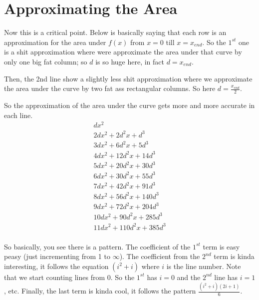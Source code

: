 \documentclass{report}
\begin{document}
\section{Approximating the Area}
Now this is a critical point. Below is basically saying that each row is an
approximation for the area under $f(x)$ from $x = 0$ till $x = x_{end}$. So the
$1^{st}$ one is a shit approximation where were approximate the area under that
curve by only one big fat column; so $d$ is so huge here, in fact $d =
x_{end}$.

Then, the 2nd line show a slightly less shit approximation where we approximate
the area under the curve by two fat ass rectangular columns. So here $d =
\frac{x_{end}}{2}$.

So the approximation of the area under the curve gets more and more accurate in
each line.
\[\begin{split}
  dx^2\\
  2dx^2 + 2d^2x + d^3\\
  3dx^2 + 6d^2x + 5d^3\\
  4dx^2 + 12d^2x + 14d^3\\
  5dx^2 + 20d^2x + 30d^3\\
  6dx^2 + 30d^2x + 55d^3\\
  7dx^2 + 42d^2x + 91d^3\\
  8dx^2 + 56d^2x + 140d^3\\
  9dx^2 + 72d^2x + 204d^3\\
  10dx^2 + 90d^2x + 285d^3\\
  11dx^2 + 110d^2x + 385d^3\\
\end{split}\]

So basically, you see there is a pattern. The coefficient of the $1^{st}$ term
is easy peasy (just incrementing from 1 to $\infty$). The coefficient from the
$2^{nd}$ term is kinda interesting, it follows the equation $(i^2+i)$ where $i$
is the line number. Note that we start counting lines from 0. So the $1^{st}$
has $i = 0$ and the $2^{nd}$ line has $i = 1$, etc. Finally, the last term is
kinda cool, it follows the pattern $\frac{(i^2+i)(2i+1)}{6}$.
\end{document}
